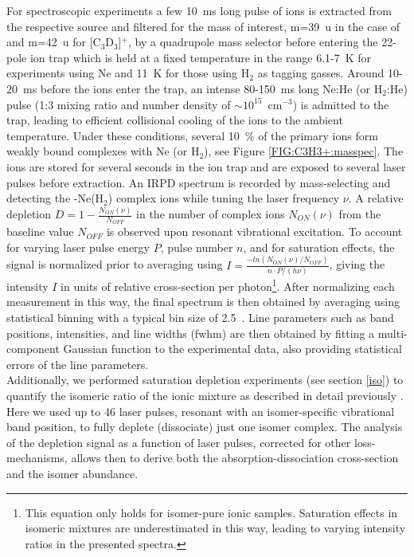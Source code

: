 For spectroscopic experiments a few 10~ms long pulse of ions is extracted from the respective source and filtered for the mass of interest, m=39~u in the case of \iso and m=42~u for [C$_3$D$_3$]$^+$, by a quadrupole mass selector before entering the 22-pole ion trap which is held at a fixed temperature in the range 6.1-7~K for experiments using Ne and 11~K for those using H$_2$ as tagging gasses. Around 10-20~ms before the ions enter the trap, an intense 80-150~ms long Ne:He (or H$_2$:He) pulse (1:3 mixing ratio and number density of $\sim 10^{15}$~cm$^{-3}$) is admitted to the trap, leading to efficient collisional cooling of the ions to the ambient temperature. Under these conditions, several 10~\% of the primary ions form weakly bound complexes with Ne (or H$_2$), see Figure \ref{FIG:C3H3+:masspec}. The ions are stored for several seconds in the ion trap and are exposed to several laser pulses before extraction. An IRPD spectrum is recorded by mass-selecting and detecting the \ison-Ne(H$_2$) complex ions while tuning the laser frequency $\nu$. A relative depletion $D=1-\frac{N_{ON}(\nu)}{N_{OFF}}$ in the number of complex ions $N_{ON}(\nu)$ from the baseline value $N_{OFF}$ is observed upon resonant vibrational excitation. To account for varying laser pulse energy $P$, pulse number $n$, and for saturation effects, the signal is normalized prior to averaging using $I=\frac{- ln(N_{ON}(\nu)/N_{OFF})}{n\cdot P/(h\nu)}$, giving the intensity $I$ in units of relative cross-section per photon\footnote{This equation only holds for isomer-pure ionic samples. Saturation effects in isomeric mixtures are underestimated in this way, leading to varying intensity ratios in the presented spectra.}. After normalizing each measurement in this way, the final spectrum is then obtained by averaging using statistical binning with a typical bin size of 2.5~\wn. Line parameters such as band positions, intensities, and line widths (fwhm) are then obtained by fitting a multi-component Gaussian function to the experimental data, also providing statistical errors of the line parameters. \\

Additionally, we performed saturation depletion experiments (see section \ref{iso}) to quantify the isomeric ratio of the ionic mixture as described in detail previously \citep{JSB2018,jusko_felion_2019}. Here we used up to 46 laser pulses, resonant with an isomer-specific vibrational band position, to fully deplete (dissociate) just one isomer complex. The analysis of the depletion signal as a function of laser pulses, corrected for other loss-mechanisms, allows then to derive both the absorption-dissociation cross-section and the isomer abundance. \\

